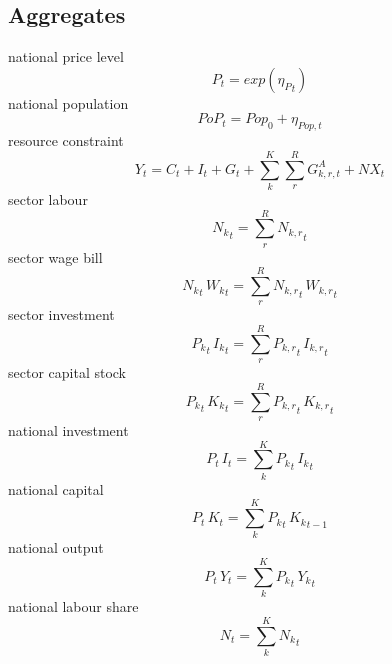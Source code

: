 \subsection{Aggregates}
national price level
\begin{dmath}
{P_{t}}=exp\left({{\eta_{P}}_{t}}\right)
\end{dmath}
national population
\begin{dmath}
PoP_{t}=Pop_0 + \eta_{Pop,t}
\end{dmath}
resource constraint
\begin{dmath}
{Y_{t}}={C_{t}}+{I_{t}}+{G_{t}}+\sum_{k}^{K} \sum_{r}^{R} {G^{A}_{k,r,t}} + {NX_{t}}
\end{dmath}
sector labour
\begin{dmath}
{{N_k}_{t}}={\sum_{r}^{R} {N_{k,r}}_{t}}
\end{dmath}
sector wage bill
\begin{dmath}
{{N_k}_{t}}\, {{W_k}_{t}}={\sum_{r}^{R} {N_{k,r}}_{t}}\, {{W_{k,r}}_{t}}
\end{dmath}
sector investment
\begin{dmath}
{{P_k}_{t}}\, {{I_k}_{t}}={\sum_{r}^{R} {P_{k,r}}_{t}}\, {{I_{k,r}}_{t}}
\end{dmath}
sector capital stock
\begin{dmath}
{{P_k}_{t}}\, {{K_k}_{t}}={\sum_{r}^{R} {P_{k,r}}_{t}}\, {{K_{k,r}}_{t}}
\end{dmath}
national investment
\begin{dmath}
{P_{t}}\, {I_{t}}={\sum_{k}^{K} {P_k}_{t}}\, {{I_k}_{t}}
\end{dmath}
national capital
\begin{dmath}
{P_{t}}\, {K_{t}}={\sum_{k}^{K} {P_k}_{t}}\, {{K_k}_{t-1}}
\end{dmath}
national output
\begin{dmath}
{P_{t}}\, {Y_{t}}={\sum_{k}^{K} {P_k}_{t}}\, {{Y_k}_{t}}
\end{dmath}
national labour share
\begin{dmath}
{N_{t}}={\sum_{k}^{K} {N_k}_{t}}
\end{dmath}
